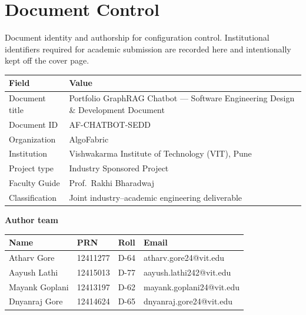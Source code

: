 \documentclass[12pt,a4paper]{report}
\begin{document}
\setcounter{page}{1}

\chapter*{Document Control}

\noindent
Document identity and authorship for configuration control. Institutional identifiers required for academic submission are recorded here and intentionally kept off the cover page.

\vspace{1em}
\begin{tabularx}{\textwidth}{@{}lX@{}}
\toprule
\textbf{Field} & \textbf{Value} \\
\midrule
Document title & Portfolio GraphRAG Chatbot --- Software Engineering Design \& Development Document \\
Document ID & AF-CHATBOT-SEDD \\
Organization & AlgoFabric \\
Institution & Vishwakarma Institute of Technology (VIT), Pune \\
Project type & Industry Sponsored Project \\
Faculty Guide & Prof.\ Rakhi Bharadwaj \\
Classification & Joint industry--academic engineering deliverable \\
\bottomrule
\end{tabularx}

\vspace{1.2em}
\noindent\textbf{Author team}

\vspace{0.5em}
\begin{tabularx}{\textwidth}{@{}lllX@{}}
\toprule
\textbf{Name} & \textbf{PRN} & \textbf{Roll} & \textbf{Email} \\
\midrule
Atharv Gore & 12411277 & D-64 & atharv.gore24@vit.edu \\
Aayush Lathi & 12415013 & D-77 & aayush.lathi242@vit.edu \\
Mayank Goplani & 12413197 & D-62 & mayank.goplani24@vit.edu \\
Dnyanraj Gore & 12414624 & D-65 & dnyanraj.gore24@vit.edu \\
\bottomrule
\end{tabularx}
\end{document}
